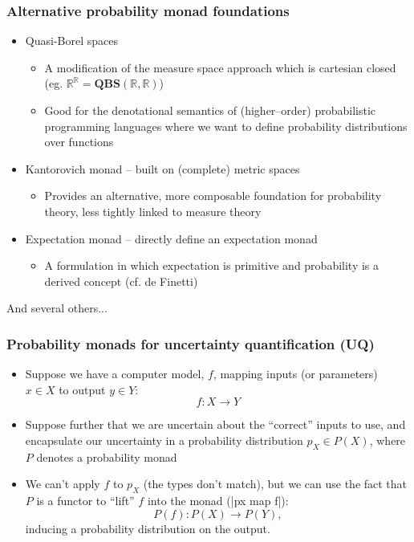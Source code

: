 \documentclass[mathserif,handout]{beamer}
\newcommand{\reals}{\mathbb{R}}
\begin{document}
\begin{frame}
  \frametitle{Alternative probability monad foundations}
  \begin{itemize}
\item \alert{Quasi-Borel spaces}
    \begin{itemize}
    \item A modification of the measure space approach which is cartesian closed (eg. $\reals^\reals = \mathbf{QBS}(\reals,\reals)$)
      \item Good for the denotational semantics of (higher--order) probabilistic programming languages where we want to define probability distributions over functions
    \end{itemize}
  \item \alert{Kantorovich monad} -- built on (complete) metric spaces
    \begin{itemize}
\item Provides an alternative, more composable foundation for probability theory, less tightly linked to measure theory
    \end{itemize}
  \item \alert{Expectation monad} -- directly define an expectation monad
    \begin{itemize}
      \item A formulation in which expectation is primitive and probability is a derived concept (cf. de Finetti)
    \end{itemize}
  \end{itemize}
And several others...
\end{frame}


\begin{frame}[fragile]
  \frametitle{Probability monads for uncertainty quantification (UQ)}
  \begin{itemize}
  \item Suppose we have a \alert{computer model}, $f$, mapping inputs (or parameters) $x\in X$ to output $y\in Y$:
    \[
    f: X \longrightarrow Y
    \]
  \item Suppose further that we are uncertain about the ``correct'' inputs to use, and encapsulate our uncertainty in a probability distribution $p_X \in P(X)$, where $P$ denotes a probability monad
  \item We can't apply $f$ to $p_X$ (the types don't match), but we can use the fact that $P$ is a functor to ``lift'' $f$ into the monad (|px map f|):
    \[
    P(f): P(X) \longrightarrow P(Y),
    \]
    inducing a probability distribution on the output.
  \end{itemize}
\end{frame}
\end{document}
